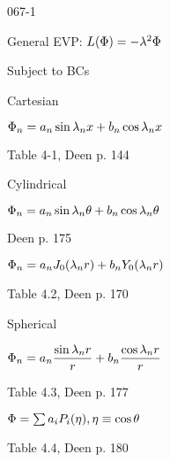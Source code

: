 \begin{mitframe}{067-1}
 \begin{listone}
	\item General EVP: $\length(\pot)=-\lambda^2\pot$
    \item Subject to BCs
    \item Cartesian
    	\begin{listtwo}
        	\item $\pot_n=\activity_n\sin\lambda_n\disp+b_n\cos\lambda_n\disp$
            	\begin{listthree}
                	\item Table 4-1, Deen p. 144
                \end{listthree}
        \end{listtwo}
    \item Cylindrical
    	\begin{listtwo}
        	\item $\pot_n=\activity_n\sin\wavel_n\theta+b_n\cos\wavel_n\theta$
            	\begin{listthree}
                	\item Deen p. 175
                \end{listthree}
            \item $\pot_n=\activity_n{J}_{\init}(\wavel_n\pos)+b_nY_{\init}(\wavel_n\pos)$
            	\begin{listthree}
                	\item Table 4.2, Deen p. 170
                \end{listthree}
        \end{listtwo}
    \item Spherical
    	\begin{listtwo}
        	\item $\pot_n=\activity_n\dfrac{\sin\wavel_n\pos}{\pos}+b_n\dfrac{\cos\wavel_n\pos}{\pos}$
            \begin{listthree}	
                \item Table 4.3, Deen p. 177
             \end{listthree}
            \item $\pot=\sum\nolimits\activity_{\state}\p_{\state}(\intrinsvisc),\intrinsvisc\equiv\cos\theta$
            \begin{listthree}
            	\item Table 4.4, Deen p. 180
            \end{listthree}
        \end{listtwo}
\end{listone}   
\end{mitframe}